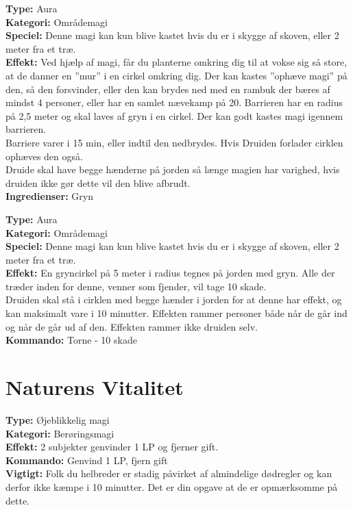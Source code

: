 \begin{nly*}
\textbf{Type:} Aura\\ 
\textbf{Kategori:} Områdemagi\\
\textbf{Speciel:} Denne magi kan kun blive kastet hvis du er i skygge af skoven, eller 2 meter fra et træ.\\
\textbf{Effekt:} Ved hjælp af magi, får du planterne omkring dig til at vokse sig så store, at de danner en ”mur” i en cirkel omkring dig. Der kan kastes ”ophæve magi” på den, så den forsvinder, eller den kan brydes ned med en rambuk der bæres af mindst 4 personer, eller har en samlet nævekamp på 20. Barrieren har en radius på 2,5 meter og skal laves af gryn i en cirkel. Der kan godt kastes magi igennem barrieren.\\
Barriere varer i 15 min, eller indtil den nedbrydes. Hvis Druiden forlader cirklen ophæves den også.\\
Druide skal have begge hænderne på jorden så længe magien har varighed, hvis druiden ikke gør dette vil den blive afbrudt.\\
\textbf{Ingredienser:} Gryn
\end{nly*}


\begin{nly*}
\textbf{Type:} Aura  \\
\textbf{Kategori:} Områdemagi\\
\textbf{Speciel:} Denne magi kan kun blive kastet hvis du er i skygge af skoven, eller 2 meter fra et træ.\\
\textbf{Effekt:} En gryncirkel på 5 meter i radius tegnes på jorden med gryn. Alle der træder inden for denne, venner som fjender, vil tage 10 skade.\\ 
Druiden skal stå i cirklen med begge hænder i jorden for at denne har effekt, og kan maksimalt vare i 10 minutter. Effekten rammer personer både når de går ind og når de går ud af den. Effekten rammer ikke druiden selv.\\
\textbf{Kommando:} Torne - 10 skade
\end{nly*}

\section{Naturens Vitalitet}
\begin{nvit*}
\textbf{Type:} Øjeblikkelig magi \\
\textbf{Kategori:} Berøringsmagi \\
\textbf{Effekt:} 2 subjekter genvinder 1 LP og fjerner gift.\\
\textbf{Kommando:} Genvind 1 LP, fjern gift\\
\textbf{Vigtigt:} Folk du helbreder er stadig påvirket af almindelige dødregler og kan derfor ikke kæmpe i 10 minutter. Det er din opgave at de er opmærksomme på dette.
\end{nvit*}

